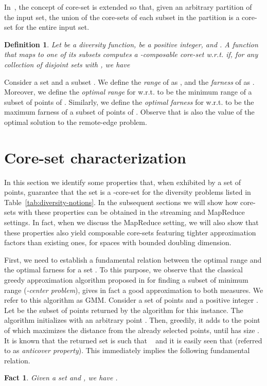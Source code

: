 \documentclass{article}
\newtheorem{definition}{Definition}
\newtheorem{fact}{Fact}
\begin{document}
In~\cite{IndykMMM14, AghamolaeiFZ15}, the concept of core-set is
extended so that, given an arbitrary partition of the input set, the
union of the core-sets of each subset in the partition is a core-set
for the entire input set.
\begin{definition}\label{def:composable-core-set}
  Let  be a diversity function,  be a positive
  integer, and . A function  that maps
   to one of its subsets computes a {\em
    -composable core-set} w.r.t.   if, for any
  collection of disjoint sets  with
  , we have
  
\end{definition}

Consider a set  and a subset . We
define the \emph{range} of  as
, and the \emph{farness} of 
as . Moreover, we
define the \emph{optimal range}  for  w.r.t.  to be the
minimum range of a subset of  points of . Similarly, we define
the \emph{optimal farness}  for  w.r.t.  to be the
maximum farness of a subset of  points of . Observe that
 is also the value of the optimal solution to the
remote-edge problem.

\section{Core-set characterization}\label{sec:basic-properties}

In this section we identify some properties that, when exhibited by a
set of points, guarantee that the set is a -core-set for
the diversity problems listed in Table~\ref{tab:diversity-notions}. In
the subsequent sections we will show how core-sets with these
properties can be obtained in the streaming and MapReduce settings. In
fact, when we discuss the MapReduce setting, we will also show that
these properties also yield composable core-sets featuring tighter
approximation factors than existing ones, for spaces
with bounded doubling dimension.

First, we need to establish a fundamental relation between the optimal
range  and the optimal farness  for a set .  To
this purpose, we observe that the classical greedy approximation
algorithm proposed in \cite{Gonzalez85} for finding a subset of
minimum range (\emph{-center problem}), gives in fact a good
approximation to both measures. We refer to this algorithm as {\sc
  GMM}.  Consider a set of points  and a positive integer . Let  be the subset of  points returned
by the algorithm for this instance. The algorithm initializes  with
an arbitrary point . Then, greedily, it adds to  the point
of  which maximizes the distance from the already
selected points, until  has size .  It is known that the
returned set  is such that ~\cite{Gonzalez85} and
it is easily seen that  (referred to as
\emph{anticover property}). This immediately implies the following
fundamental relation.
\begin{fact}\label{fact:opt-radius-farness}
Given a set  and , we have .
\end{fact}
\end{document}

